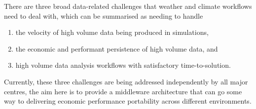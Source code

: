 

There are three broad data-related challenges that weather and climate workflows need to deal with, which can be summarised as needing to handle
\begin{enumerate}
\item the velocity of high volume data being produced in simulations, 
\item the economic and performant persistence of high volume data, and
\item high volume data analysis workflows with satisfactory time-to-solution.
\end{enumerate}

Currently, these three challenges are being addressed independently by all major centres,
the aim here is to provide a middleware architecture that can go some way to delivering economic performance portability across different environments.

